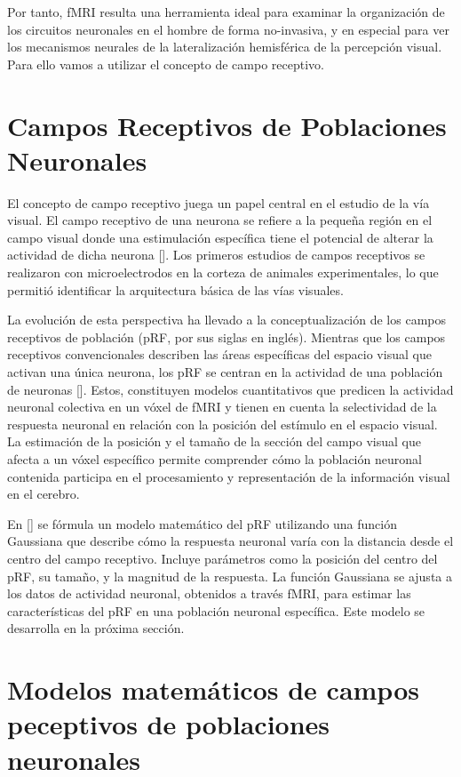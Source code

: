 Por tanto, fMRI resulta una herramienta ideal para examinar la organización de los circuitos neuronales en el hombre de forma no-invasiva, y en especial para ver los mecanismos neurales de la lateralización hemisférica de la percepción visual. Para ello vamos a utilizar el concepto de campo receptivo.

\section{Campos Receptivos de Poblaciones Neuronales}

El concepto de campo receptivo juega un papel central en el estudio de la vía visual. El campo receptivo de una neurona se refiere a la pequeña región en el campo visual donde una estimulación específica tiene el potencial de alterar la actividad de dicha neurona [\cite{kandel_principles_2021}]. Los primeros estudios de campos receptivos se realizaron con microelectrodos en la corteza de animales experimentales, lo que permitió identificar la arquitectura básica de las vías visuales. 

La evolución de esta perspectiva ha llevado a la conceptualización de los campos receptivos de población (pRF, por sus siglas en ingl\'es). Mientras que los campos receptivos convencionales describen las áreas específicas del espacio visual que activan una única neurona, los pRF se centran en la actividad de una población de neuronas [\cite{dumoulin_population_2008}]. Estos, constituyen modelos cuantitativos que predicen la actividad neuronal colectiva en un vóxel de fMRI y tienen en cuenta la selectividad de la respuesta neuronal en relación con la posición del estímulo en el espacio visual. La estimación de la posición y el tamaño de la sección del campo visual que afecta a un vóxel específico permite comprender cómo la población neuronal contenida participa en el procesamiento y representación de la información visual en el cerebro.

En [\cite{dumoulin_population_2008}] se f\'ormula un modelo matemático del pRF utilizando una función Gaussiana que describe cómo la respuesta neuronal varía con la distancia desde el centro del campo receptivo. Incluye parámetros como la posición del centro del pRF, su tamaño, y la magnitud de la respuesta. La función Gaussiana se ajusta a los datos de actividad neuronal, obtenidos a través fMRI, para estimar las características del pRF en una población neuronal específica. Este modelo se desarrolla en la próxima sección.


\section{Modelos matemáticos de campos peceptivos de poblaciones neuronales}

